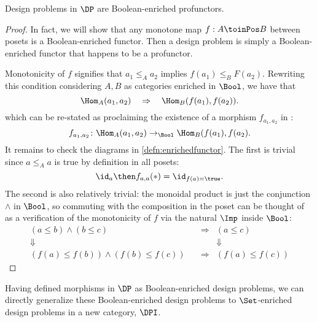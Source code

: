\begin{proposition}
Design problems in $\DP$ are Boolean-enriched profunctors.
\end{proposition}
\begin{proof}
In fact, we will show that any monotone map $f : A \toinPos B$ between posets is a Boolean-enriched functor. Then a design problem is simply a Boolean-enriched functor that happens to be a profunctor.

Monotonicity of $f$ signifies that $a_1 \leq_A a_2$ implies $f(a_1) \leq_B F(a_2)$. Rewriting this condition considering $A, B$ as categories enriched in $\Bool$, we have that
\begin{equation}
\Hom_A(a_1, a_2) \quad \Rightarrow \quad \Hom_B(f(a_1), f(a_2)).
\end{equation}
which can be re-stated as proclaiming the existence of a morphism $f_{a_1, a_2}$ in \Bool:
\begin{equation}
f_{a_1, a_2} \colon \Hom_A(a_1, a_2) \to_{\Bool} \Hom_B(f(a_1), f(a_2).
\end{equation}
It remains to check the diagrams in \cref{defn:enrichedfunctor}. The first is trivial since $a \leq_A a$ is true by definition in all posets:
\begin{equation}
\id_{a} \then f_{a,a} (\ast) = \id_{f(a) = \true}.
\end{equation}
The second is also relatively trivial: the monoidal product is just the conjunction $\wedge$ in $\Bool$, so commuting with the composition in the poset can be thought of as a verification of the monotonicity of $f$ via the natural $\Imp$ inside $\Bool$:
\begin{equation}
\begin{aligned}
(a \leq b) \wedge (b \leq c) & \quad \Rightarrow & (a \leq c) \\
\Downarrow & & \Downarrow \\
(f(a) \leq f(b)) \wedge (f(b) \leq f(c)) & \quad \Rightarrow & (f(a) \leq f(c))
\end{aligned}
\end{equation}
\end{proof}

Having defined morphisms in $\DP$ as Boolean-enriched design problems, we can directly generalize these Boolean-enriched design problems to $\Set$-enriched design problems in a new category, $\DPI$.

